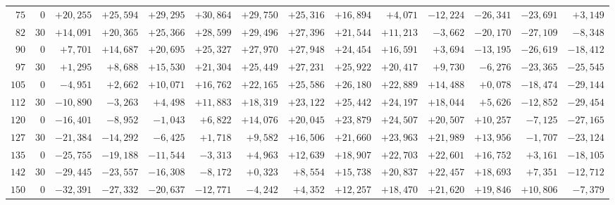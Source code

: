 \begin{landscape}
\begin{longtable}{@{}rr|r|r|r|r|r|r|r|r|r|r|r|r@{}}
\(75\) & \(0\) & \(+20{,}255\) & \(+25{,}594\) & \(+29{,}295\) & \(+30{,}864\) & \(+29{,}750\) & \(+25{,}316\) & \(+16{,}894\) & \(+4{,}071\) & \(-12{,}224\) & \(-26{,}341\) & \(-23{,}691\) & \(+3{,}149\)\\
\(82\) & \(30\) & \(+14{,}091\) & \(+20{,}365\) & \(+25{,}366\) & \(+28{,}599\) & \(+29{,}496\) & \(+27{,}396\) & \(+21{,}544\) & \(+11{,}213\) & \(-3{,}662\) & \(-20{,}170\) & \(-27{,}109\) & \(-8{,}348\)\\[2pt]
\(90\) & \(0\) & \(+7{,}701\) & \(+14{,}687\) & \(+20{,}695\) & \(+25{,}327\) & \(+27{,}970\) & \(+27{,}948\) & \(+24{,}454\) & \(+16{,}591\) & \(+3{,}694\) & \(-13{,}195\) & \(-26{,}619\) & \(-18{,}412\)\\
\(97\) & \(30\) & \(+1{,}295\) & \(+8{,}688\) & \(+15{,}530\) & \(+21{,}304\) & \(+25{,}449\) & \(+27{,}231\) & \(+25{,}922\) & \(+20{,}417\) & \(+9{,}730\) & \(-6{,}276\) & \(-23{,}365\) & \(-25{,}545\)\\
\(105\) & \(0\) & \(-4{,}951\) & \(+2{,}662\) & \(+10{,}071\) & \(+16{,}762\) & \(+22{,}165\) & \(+25{,}586\) & \(+26{,}180\) & \(+22{,}889\) & \(+14{,}488\) & \(+0{,}078\) & \(-18{,}474\) & \(-29{,}144\)\\
\(112\) & \(30\) & \(-10{,}890\) & \(-3{,}263\) & \(+4{,}498\) & \(+11{,}883\) & \(+18{,}319\) & \(+23{,}122\) & \(+25{,}442\) & \(+24{,}197\) & \(+18{,}044\) & \(+5{,}626\) & \(-12{,}852\) & \(-29{,}454\)\\[2pt]
\(120\) & \(0\) & \(-16{,}401\) & \(-8{,}952\) & \(-1{,}043\) & \(+6{,}822\) & \(+14{,}076\) & \(+20{,}045\) & \(+23{,}879\) & \(+24{,}507\) & \(+20{,}507\) & \(+10{,}257\) & \(-7{,}125\) & \(-27{,}165\)\\
\(127\) & \(30\) & \(-21{,}384\) & \(-14{,}292\) & \(-6{,}425\) & \(+1{,}718\) & \(+9{,}582\) & \(+16{,}506\) & \(+21{,}660\) & \(+23{,}963\) & \(+21{,}989\) & \(+13{,}956\) & \(-1{,}707\) & \(-23{,}124\)\\
\(135\) & \(0\) & \(-25{,}755\) & \(-19{,}188\) & \(-11{,}544\) & \(-3{,}313\) & \(+4{,}963\) & \(+12{,}639\) & \(+18{,}907\) & \(+22{,}703\) & \(+22{,}601\) & \(+16{,}752\) & \(+3{,}161\) & \(-18{,}105\)\\
\(142\) & \(30\) & \(-29{,}445\) & \(-23{,}557\) & \(-16{,}308\) & \(-8{,}172\) & \(+0{,}323\) & \(+8{,}554\) & \(+15{,}738\) & \(+20{,}837\) & \(+22{,}457\) & \(+18{,}693\) & \(+7{,}351\) & \(-12{,}712\)\\[2pt]
\(150\) & \(0\) & \(-32{,}391\) & \(-27{,}332\) & \(-20{,}637\) & \(-12{,}771\) & \(-4{,}242\) & \(+4{,}352\) & \(+12{,}257\) & \(+18{,}470\) & \(+21{,}620\) & \(+19{,}846\) & \(+10{,}806\) & \(-7{,}379\)\\

\end{longtable}
\end{landscape}
